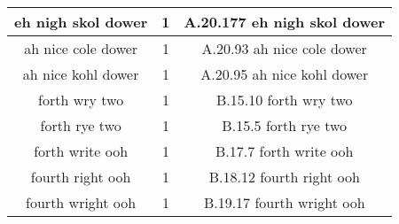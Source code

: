\begin{center}
\begin{longtable}{|c|c|c|}
\hline 
eh nigh skol dower   & 1 & A.20.177    eh nigh skol dower  \\
\hline 
ah nice cole dower   & 1 & A.20.93    ah nice cole dower  \\
\hline 
ah nice kohl dower   & 1 & A.20.95    ah nice kohl dower  \\
\hline 
forth wry two   & 1 & B.15.10    forth wry two  \\
\hline 
forth rye two   & 1 & B.15.5    forth rye two  \\
\hline 
forth write ooh   & 1 & B.17.7    forth write ooh  \\
\hline 
fourth right ooh   & 1 & B.18.12    fourth right ooh  \\
\hline 
fourth wright ooh   & 1 & B.19.17    fourth wright ooh  \\
\hline

\end{longtable}

\end{center}